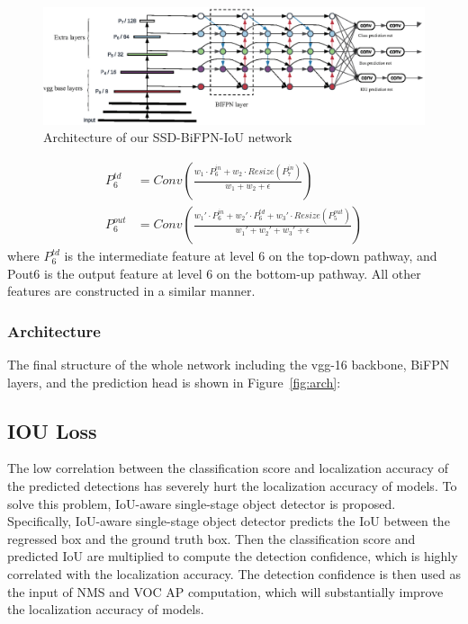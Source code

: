 \documentclass[journal,conference]{IEEEtran}
\begin{document}
\begin{figure}[htbp]
  \centering
  \includegraphics[width=\linewidth]{fig/ssd_iou.eps}
  \caption{Architecture of our SSD-BiFPN-IoU network}\label{fig:iou}
\end{figure}

\begin{align*}
  P_6^{td}  & =Conv\left(\frac{w_1\cdot P_6^{in}+w_2\cdot Resize(P_7^{in})}{w_1+w_2+\epsilon}\right)                              \\
  P_6^{out} & =Conv\left(\frac{w_1'\cdot P_6^{in}+w_2'\cdot P_6^{td}+w_3'\cdot Resize(P_5^{out})}{w_1'+w_2'+w_3'+\epsilon}\right)
\end{align*}
where $P_6^{td}$ is the intermediate feature at level 6 on the top-down pathway, and Pout6 is the output feature at level 6 on the bottom-up pathway. All other features are constructed in a similar manner.

\subsubsection{Architecture}
The final structure of the whole network including the vgg-16 backbone, BiFPN layers, and the prediction head is shown in Figure~\ref{fig:arch}:


\subsection{IOU Loss}
The low correlation between the classification score and localization accuracy of the predicted detections has severely hurt the localization accuracy of models. To solve this problem, IoU-aware single-stage object detector is proposed. Specifically, IoU-aware single-stage object detector predicts the IoU between the regressed box and the ground truth box. Then the classification score and predicted IoU are multiplied to compute the detection confidence, which is highly correlated with the localization accuracy. The detection confidence is then used as the input of NMS and VOC AP computation, which will substantially improve the localization accuracy of models.
\end{document}
